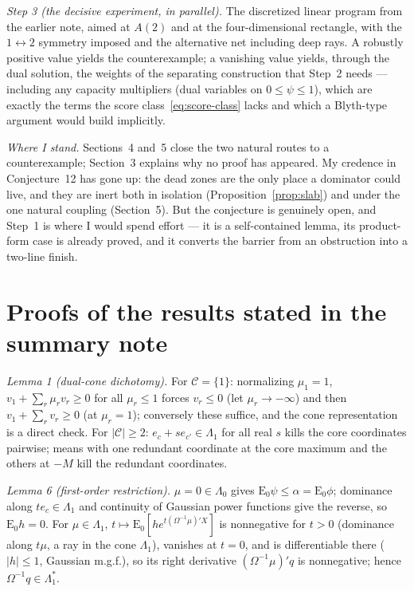 \documentclass[12pt]{article}
\theoremstyle{remark}
\newcommand{\E}{\mathrm E}
\newcommand{\cC}{\mathcal C}
\begin{document}
\emph{Step 3 (the decisive experiment, in parallel).} The discretized
linear program from the earlier note, aimed at $A(2)$ and at the
four-dimensional rectangle, with the $1\leftrightarrow2$ symmetry imposed
and the alternative net including deep rays. A robustly positive value
yields the counterexample; a vanishing value yields, through the dual
solution, the weights of the separating construction that Step~2 needs ---
including any capacity multipliers (dual variables on $0\le\psi\le1$),
which are exactly the terms the score class~\eqref{eq:score-class} lacks
and which a Blyth-type argument would build implicitly.

\emph{Where I stand.} Sections~4 and~5 close the two natural routes to a
counterexample; Section~3 explains why no proof has appeared. My credence
in Conjecture~12 has gone up: the dead zones are the only place a
dominator could live, and they are inert both in isolation
(Proposition~\ref{prop:slab}) and under the one natural coupling
(Section~5). But the conjecture is genuinely open, and Step~1 is where I
would spend effort --- it is a self-contained lemma, its product-form case
is already proved, and it converts the barrier from an obstruction into a
two-line finish.

\appendix

\section{Proofs of the results stated in the summary note}

\emph{Lemma 1 (dual-cone dichotomy).} For $\cC=\{1\}$: normalizing
$\mu_1=1$, $v_1+\sum_r\mu_rv_r\ge0$ for all $\mu_r\le1$ forces $v_r\le0$
(let $\mu_r\to-\infty$) and then $v_1+\sum_rv_r\ge0$ (at $\mu_r=1$);
conversely these suffice, and the cone representation is a direct check.
For $|\cC|\ge2$: $e_c+se_{c'}\in\Lambda_1$ for all real $s$ kills the core
coordinates pairwise; means with one redundant coordinate at the core
maximum and the others at $-M$ kill the redundant coordinates.

\emph{Lemma 6 (first-order restriction).} $\mu=0\in\Lambda_0$ gives
$\E_0\psi\le\alpha=\E_0\phi$; dominance along $te_c\in\Lambda_1$ and
continuity of Gaussian power functions give the reverse, so $\E_0h=0$.
For $\mu\in\Lambda_1$, $t\mapsto\E_0[he^{t(\Omega^{-1}\mu)'X}]$ is
nonnegative for $t>0$ (dominance along $t\mu$, a ray in the cone
$\Lambda_1$), vanishes at $t=0$, and is differentiable there ($|h|\le1$,
Gaussian m.g.f.), so its right derivative $(\Omega^{-1}\mu)'q$ is
nonnegative; hence $\Omega^{-1}q\in\Lambda_1^*$.
\end{document}
